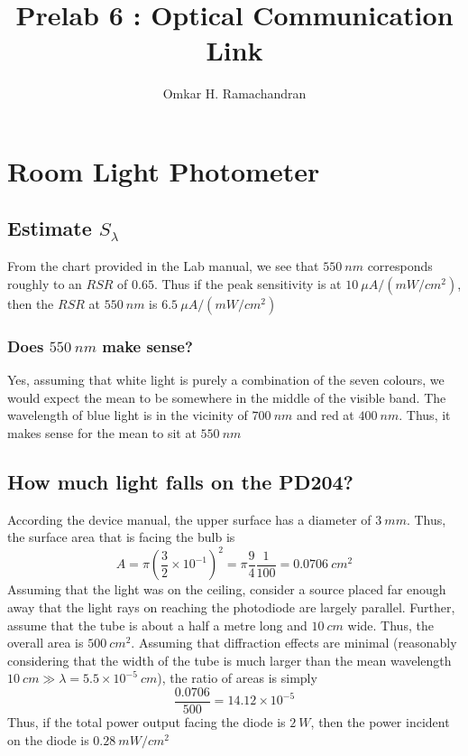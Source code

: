 \documentclass[english]{article}
\begin{document}
\title{Prelab 6 : Optical Communication Link}

\author{Omkar H. Ramachandran}
\maketitle

\section{Room Light Photometer}

\subsection{Estimate $S_{\lambda}$}

From the chart provided in the Lab manual, we see that $550\ nm$
corresponds roughly to an $RSR$ of $0.65$. Thus if the peak sensitivity
is at $10\ \mu A/(mW/cm^{2})$, then the $RSR$ at $550\ nm$ is $6.5\ \mu A/(mW/cm^{2})$

\subsubsection*{Does $550\ nm$ make sense?}

Yes, assuming that white light is purely a combination of the seven
colours, we would expect the mean to be somewhere in the middle of
the visible band. The wavelength of blue light is in the vicinity
of $700\ nm$ and red at $400\ nm$. Thus, it makes sense for the
mean to sit at $550\ nm$

\subsection{How much light falls on the PD204?}

According the device manual, the upper surface has a diameter of $3\ mm$.
Thus, the surface area that is facing the bulb is
\[
A=\pi\left(\frac{3}{2}\times10^{-1}\right)^{2}=\pi\frac{9}{4}\frac{1}{100}=0.0706\ cm^{2}
\]
Assuming that the light was on the ceiling, consider a source placed
far enough away that the light rays on reaching the photodiode are
largely parallel. Further, assume that the tube is about a half a
metre long and $10\ cm$ wide. Thus, the overall area is $500\ cm^{2}$.
Assuming that diffraction effects are minimal (reasonably considering
that the width of the tube is much larger than the mean wavelength
$10\ cm\gg\lambda=5.5\times10^{-5}\ cm$), the ratio of areas is simply
\[
\frac{0.0706}{500}=14.12\times10^{-5}
\]
Thus, if the total power output facing the diode is $2\ W$, then
the power incident on the diode is $0.28\ mW/cm^{2}$
\end{document}
